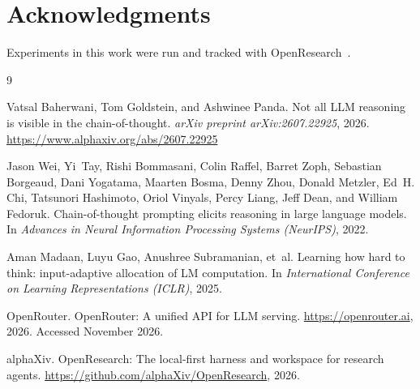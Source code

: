 \documentclass[11pt,a4paper]{article}
\begin{document}
\section*{Acknowledgments}
Experiments in this work were run and tracked with
OpenResearch~\citep{openresearch}.

\begin{thebibliography}{9}

Vatsal Baherwani, Tom Goldstein, and Ashwinee Panda.
\newblock Not all LLM reasoning is visible in the chain-of-thought.
\newblock \emph{arXiv preprint arXiv:2607.22925}, 2026.
\newblock \url{https://www.alphaxiv.org/abs/2607.22925}

Jason Wei, Yi~Tay, Rishi Bommasani, Colin Raffel, Barret Zoph, Sebastian
Borgeaud, Dani Yogatama, Maarten Bosma, Denny Zhou, Donald Metzler, Ed~H. Chi,
Tatsunori Hashimoto, Oriol Vinyals, Percy Liang, Jeff Dean, and William
Fedoruk.
\newblock Chain-of-thought prompting elicits reasoning in large language
models.
\newblock In \emph{Advances in Neural Information Processing Systems
(NeurIPS)}, 2022.

Aman Madaan, Luyu Gao, Anushree Subramanian, et~al.
\newblock Learning how hard to think: input-adaptive allocation of LM
computation.
\newblock In \emph{International Conference on Learning Representations
(ICLR)}, 2025.

OpenRouter.
\newblock OpenRouter: A unified API for LLM serving.
\newblock \url{https://openrouter.ai}, 2026. Accessed November 2026.

alphaXiv.
\newblock OpenResearch: The local-first harness and workspace for research
agents.
\newblock \url{https://github.com/alphaXiv/OpenResearch}, 2026.

\end{thebibliography}
\end{document}
